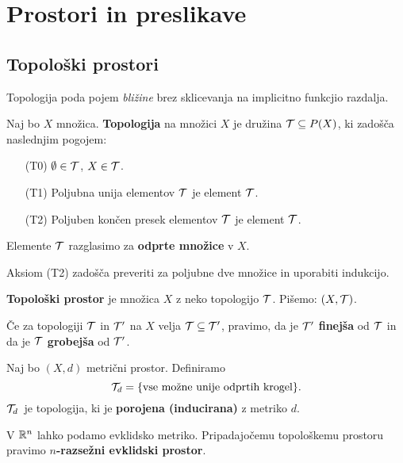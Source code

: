 \section{Prostori in preslikave}
\subsection{Topološki prostori}
Topologija poda pojem \emph{bližine} brez sklicevanja na implicitno funkcjio razdalja.

\begin{definicija}
    Naj bo $X$ množica. \textbf{Topologija} na množici $X$ je družina $\mathcal{T} \subseteq P(X)$, ki zadošča naslednjim pogojem:
    \begin{enumerate}
        \item[(T0)] $\emptyset \in \mathcal{T}$, $X \in \mathcal{T}$.
        \item[(T1)] Poljubna unija elementov $\mathcal{T}$ je element $\mathcal{T}$.
        \item[(T2)] Poljuben končen presek elementov $\mathcal{T}$ je element $\mathcal{T}$.
    \end{enumerate}
    Elemente $\mathcal{T}$ razglasimo za \textbf{odprte množice} v $X$.
\end{definicija}

\begin{opomba}
    Aksiom (T2) zadošča preveriti za poljubne dve množice in uporabiti indukcijo.
\end{opomba}

\begin{definicija}
    \textbf{Topološki prostor} je množica $X$ z neko topologijo $\mathcal{T}$. Pišemo: $(X, \mathcal{T})$.
\end{definicija}

\begin{definicija}
    Če za topologiji $\mathcal{T}$ in $\mathcal{T}'$ na $X$ velja $\mathcal{T} \subseteq \mathcal{T}'$, pravimo, da je $\mathcal{T}'$ \textbf{finejša} od $\mathcal{T}$ in da je $\mathcal{T}$ \textbf{grobejša} od $\mathcal{T}'$. 
\end{definicija}

\begin{primer}
    Naj bo $(X, d)$ metrični prostor. Definiramo $$\mathcal{T}_d = \{\text{vse možne unije odprtih krogel}\}.$$ $\mathcal{T}_d$~je topologija, ki je \textbf{porojena (inducirana)} z metriko $d$.
\end{primer}

\begin{primer}
    V $\mathbb{R}^n$ lahko podamo evklidsko metriko. Pripadajočemu topološkemu prostoru pravimo \textbf{$n$-razsežni evklidski prostor}.
\end{primer}

